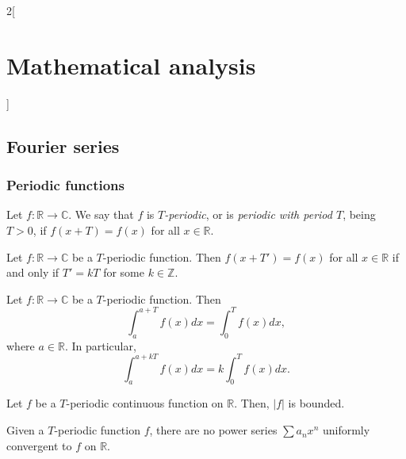 \documentclass[class=article,crop=false]{standalone}
\begin{document}
\begin{multicols}{2}[\section{Mathematical analysis}]
\subsection{Fourier series}
\subsubsection{Periodic functions}
\begin{definition}
Let $f:\mathbb{R}\rightarrow\mathbb{C}$. We say that $f$ is \textit{$T$-periodic}, or is \textit{periodic with period $T$}, being $T>0$, if $f(x+T)=f(x)$ for all $x\in\mathbb{R}$.
\end{definition}
\begin{lemma}
Let $f:\mathbb{R}\rightarrow\mathbb{C}$ be a $T$-periodic function. Then $f(x+T')=f(x)$ for all $x\in\mathbb{R}$ if and only if $T'=kT$ for some $k\in\mathbb{Z}$.
\end{lemma}
\begin{prop}
Let $f:\mathbb{R}\rightarrow\mathbb{C}$ be a $T$-periodic function. Then $$\int_a^{a+T}f(x)dx=\int_0^Tf(x)dx,$$ where $a\in\mathbb{R}$. In particular, $$\int_a^{a+kT}f(x)dx=k\int_0^Tf(x)dx.$$
\end{prop}
\begin{lemma}
Let $f$ be a $T$-periodic continuous function on $\mathbb{R}$. Then, $|f|$ is bounded.
\end{lemma}
\begin{prop}
Given a $T$-periodic function $f$, there are no power series $\sum a_nx^n$ uniformly convergent to $f$ on $\mathbb{R}$.
\end{prop}

\end{multicols}
\end{document}
